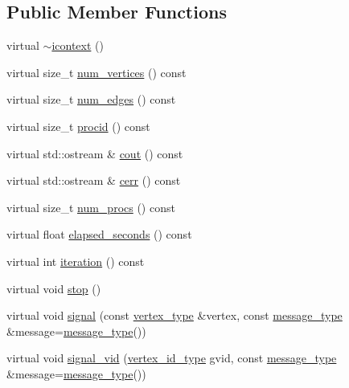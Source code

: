 \subsection*{Public Member Functions}
\begin{DoxyCompactItemize}
\item 
virtual \hyperlink{classsaedb_1_1icontext_a1486dc63f9d7198f6f364e9feae3dfc7}{$\sim$icontext} ()
\item 
virtual size\-\_\-t \hyperlink{classsaedb_1_1icontext_ad40db46945f6dfbd6e738d0206298b76}{num\-\_\-vertices} () const 
\item 
virtual size\-\_\-t \hyperlink{classsaedb_1_1icontext_aa0ea9bf7ccdbd58a7fec6fe6b124f14b}{num\-\_\-edges} () const 
\item 
virtual size\-\_\-t \hyperlink{classsaedb_1_1icontext_a806cf7e2a500cde5c58c9b35d3614e02}{procid} () const 
\item 
virtual std\-::ostream \& \hyperlink{classsaedb_1_1icontext_aebcd170e0a7f73c5c23ccc2c5109c8ad}{cout} () const 
\item 
virtual std\-::ostream \& \hyperlink{classsaedb_1_1icontext_a056142a0edfabcdcd0254a7003dcfd84}{cerr} () const 
\item 
virtual size\-\_\-t \hyperlink{classsaedb_1_1icontext_a7ae74263673ec0aeda4765a936ca20ad}{num\-\_\-procs} () const 
\item 
virtual float \hyperlink{classsaedb_1_1icontext_a4c8cc12932257edf89e97ec3e462c113}{elapsed\-\_\-seconds} () const 
\item 
virtual int \hyperlink{classsaedb_1_1icontext_a3d56a20cb9b5e48a76a1cdaba0b0f944}{iteration} () const 
\item 
virtual void \hyperlink{classsaedb_1_1icontext_a82762c9c2b4ffc8c5d15245d1af7933a}{stop} ()
\item 
virtual void \hyperlink{classsaedb_1_1icontext_a8f567cb4de0027708b081985916f8464}{signal} (const \hyperlink{classsaedb_1_1icontext_ab83a38ba860cb2101b499ae60675e4e5}{vertex\-\_\-type} \&vertex, const \hyperlink{classsaedb_1_1icontext_a7bd82d8486ab08dc1adf49dd6d659059}{message\-\_\-type} \&message=\hyperlink{classsaedb_1_1icontext_a7bd82d8486ab08dc1adf49dd6d659059}{message\-\_\-type}())
\item 
virtual void \hyperlink{classsaedb_1_1icontext_a4d9539e7488703a7c0548d54668c58aa}{signal\-\_\-vid} (\hyperlink{classsaedb_1_1icontext_ac130cf374063f27748e4770617971660}{vertex\-\_\-id\-\_\-type} gvid, const \hyperlink{classsaedb_1_1icontext_a7bd82d8486ab08dc1adf49dd6d659059}{message\-\_\-type} \&message=\hyperlink{classsaedb_1_1icontext_a7bd82d8486ab08dc1adf49dd6d659059}{message\-\_\-type}())

\end{DoxyCompactItemize}
